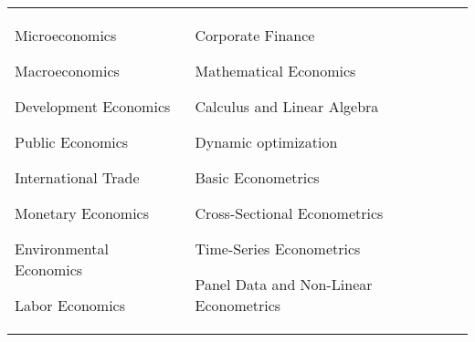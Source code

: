 

\begin{tabularx}{\textwidth}{@{}X X@{}}
Microeconomics\par
Macroeconomics\par
Development Economics\par
Public Economics\par
International Trade\par 
Monetary Economics\par 
Environmental Economics \par 
Labor Economics \par 

& 
Corporate Finance \par
Mathematical Economics\par
Calculus and Linear Algebra\par
Dynamic optimization\par
Basic Econometrics\par
Cross-Sectional Econometrics\par 
Time-Series Econometrics\par 
Panel Data and Non-Linear Econometrics \par 

\\
\end{tabularx}
